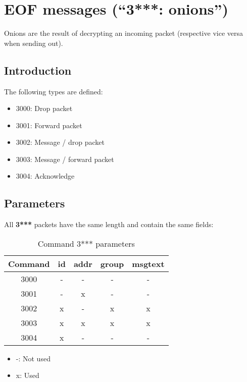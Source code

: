 \section{EOF messages ("`3***: onions"')}
Onions are the result of decrypting an incoming packet (respective vice versa
when sending out).
\subsection{Introduction}
The following types are defined:

\begin{itemize}
\item 3000: Drop packet
\item 3001: Forward packet
\item 3002: Message / drop packet
\item 3003: Message / forward packet
\item 3004: Acknowledge
\end{itemize}
\subsection{Parameters}
All \textbf{3***} packets have the same length and contain the same fields:
\begin{longtable}{|c|c|c|c|c|}
\caption{Command 3*** parameters}\\
\hline
\textbf{Command} & \textbf{id} & \textbf{addr} & \textbf{group} & \textbf{msgtext}\\
\hline
3000 & - & - & - & - \\
\hline
3001 & - & x & - & - \\
\hline
3002 & x & - & x & x \\
\hline
3003 & x & x & x & x \\
\hline
3004 & x & - & - & -\\
\hline
\end{longtable}

\begin{itemize}
\item -: Not used
\item x: Used
\end{itemize}

